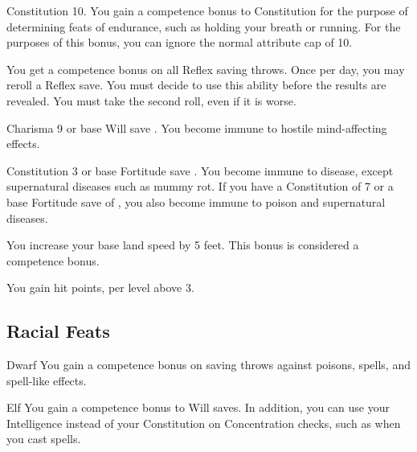 
\featpre Constitution 10.
\featben You gain a  competence bonus to Constitution for the purpose of determining feats of endurance, such as holding your breath or running. For the purposes of this bonus, you can ignore the normal attribute cap of 10.


 You get a  competence bonus on all Reflex saving throws. Once per day, you may reroll a Reflex save. You must decide to use this ability before the results are revealed. You must take the second roll, even if it is worse.

\featpre Charisma 9 or base Will save .
\featben You become immune to hostile mind-affecting effects.

\featpre Constitution 3 or base Fortitude save .
\featben You become immune to disease, except supernatural diseases such as mummy rot. If you have a Constitution of 7 or a base Fortitude save of , you also become immune to poison and supernatural diseases.


 You increase your base land speed by 5 feet. This bonus is considered a competence bonus.

 You gain  hit points,  per level above 3.

\subsection{Racial Feats}

 Dwarf
 You gain a  competence bonus on saving throws against poisons, spells, and spell-like effects.

 Elf
 You gain a  competence bonus to Will saves. In addition, you can use your Intelligence instead of your Constitution on Concentration checks, such as when you cast spells.

